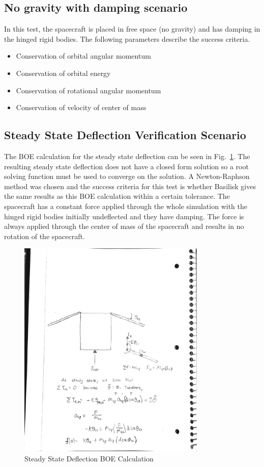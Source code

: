 \subsection{No gravity with damping scenario}
In this test, the spacecraft is placed in free space (no gravity) and has damping in the hinged rigid bodies. The following parameters describe the success criteria.
\begin{itemize}
\item Conservation of orbital angular momentum
\item Conservation of orbital energy
\item Conservation of rotational angular momentum
\item Conservation of velocity of center of mass
\end{itemize}

\subsection{Steady State Deflection Verification Scenario}

The BOE calculation for the steady state deflection can be seen in Fig.~\ref{fig:BOEThetaSS}. The resulting steady state deflection does not have a closed form solution so a root solving function must be used to converge on the solution. A Newton-Raphson method was chosen and the success criteria for this test is whether Basilisk gives the same results as this BOE calculation within a certain tolerance. The spacecraft has a constant force applied through the whole simulation with the hinged rigid bodies initially undeflected and they have damping. The force is always applied through the center of mass of the spacecraft and results in no rotation of the spacecraft. 

\begin{figure}[htbp]
	\centerline{
		\includegraphics[width=0.8\textwidth]{Figures/BOEThetaSS}}
	\caption{Steady State Deflection BOE Calculation}
	\label{fig:BOEThetaSS}
\end{figure}

